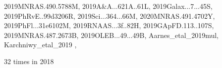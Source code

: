 \documentclass[12pt]{article}
\begin{document}
\begin{description}
{2019MNRAS.490.5788M,%
2019A&A...621A..61L,%
2019Galax...7...45S,%
2019PhRvE..99d3206R,%
2019Sci...364...66M,%
2020MNRAS.491.4702Y,%
2019PhFl...31e6102M,%
2019RNAAS...3f..82H,%
2019GApFD.113..107S,%
2019MNRAS.487.2673B,%
2019OLEB...49...49B,%
Aarnes_etal_2019mul,%
Karchniwy_etal_2019%
},\item
\item %
32 times in 2018 \citep{
2018AN....339..127K,%
2018A&A...614A.101V,%
2018A&A...616A..72W,%
2018A&A...609A..51W,%
2018JAtS...75.3469L,%
2018ApJ...858..124S,%
2018arXiv181207916K,%
2018JPhCS1031a2007M,%
2018MNRAS.479.3923Z,%
2018A&A...618A..75S,%
}
\end{description}
\end{document}
